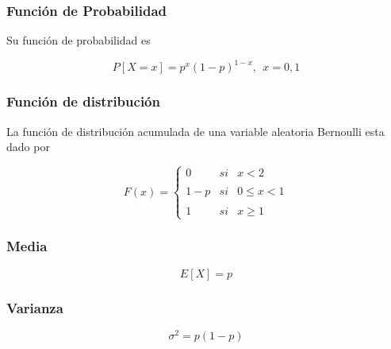 \documentclass{article}
\begin{document}
\begin{multicols}{2}
            \subsubsection{Función de Probabilidad} 

                Su función de probabilidad es

                    \begin{equation*}
                        P[X=x] = p^x(1-p)^{1-x} ,~~x=0,1
                    \end{equation*}

            \subsubsection{Función de distribución}

                La función de distribución acumulada de una variable aleatoria Bernoulli esta dado por

                    \begin{equation*}
                                    F(x)= \left\{ \begin{array}{lcc}
                                     0 &   si  & x < 2 \\
                                     \\ 1-p &  si & 0 \leq  x < 1 \\
                                     \\ 1 &  si  & x \geq 1
                                     \end{array}
                           \right.
                    \end{equation*}

            \subsubsection{Media}

                \begin{equation*}
                    E[X] = p
                \end{equation*}
                
            \subsubsection{Varianza}

                \begin{equation*}
                    \sigma ^2 = p(1-p)
                \end{equation*}
                

\end{multicols}
\end{document}
